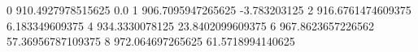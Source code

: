 0 910.4927978515625 0.0
1 906.7095947265625 -3.783203125
2 916.6761474609375 6.183349609375
4 934.3330078125 23.8402099609375
6 967.8623657226562 57.36956787109375
8 972.064697265625 61.5718994140625
